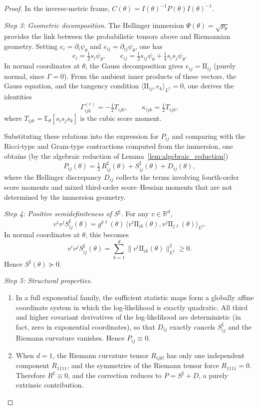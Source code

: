 \documentclass[11pt,letterpaper]{amsart}
\newcommand{\E}{\mathbb{E}}
\numberwithin{equation}{section}
\theoremstyle{plain}
\theoremstyle{definition}
\theoremstyle{remark}
\begin{document}
\begin{proof}
In the inverse-metric frame, $C(\theta)=I(\theta)^{-1}P(\theta)I(\theta)^{-1}$.

\medskip
\noindent\textit{Step 3: Geometric decomposition.}
The Hellinger immersion \(\Psi(\theta)=\sqrt{p_\theta}\) provides the link between the probabilistic tensors above and Riemannian geometry. Setting \(e_i=\partial_i\psi_\theta\) and \(e_{ij}=\partial_{ij}\psi_\theta\), one has
\[
e_i=\tfrac12 s_i\psi_\theta,
\qquad
e_{ij}=\tfrac12 s_{ij}\psi_\theta+\tfrac14 s_is_j\psi_\theta.
\]
In normal coordinates at \(\theta\), the Gauss decomposition gives \(e_{ij}=\mathrm{II}_{ij}\) (purely normal, since \(\Gamma=0\)). From the ambient inner products of these vectors, the Gauss equation, and the tangency condition \(\langle \mathrm{II}_{ij},e_k\rangle_{L^2}=0\), one derives the identities
\[
\Gamma^{(e)}_{ijk}=-\tfrac12 T_{ijk},
\qquad
\kappa_{ijk}=\tfrac12 T_{ijk},
\]
where \(T_{ijk}=\E_\theta[s_is_js_k]\) is the cubic score moment.

Substituting these relations into the expression for \(P_{ij}\) and comparing with the Ricci-type and Gram-type contractions computed from the immersion, one obtains (by the algebraic reduction of Lemma~\ref{lem:algebraic_reduction})
\[
P_{ij}(\theta)
=
\tfrac12\,R^\sharp_{ij}(\theta)+S^\sharp_{ij}(\theta)+D_{ij}(\theta),
\]
where the Hellinger discrepancy \(D_{ij}\) collects the terms involving fourth-order score moments and mixed third-order score--Hessian moments that are not determined by the immersion geometry.

\medskip
\noindent\textit{Step 4: Positive semidefiniteness of \(S^\sharp\).}
For any \(v\in\mathbb{R}^d\),
\[
v^iv^jS^\sharp_{ij}(\theta)
=
g^{k\ell}(\theta)\,\langle v^i\mathrm{II}_{ik}(\theta),v^j\mathrm{II}_{j\ell}(\theta)\rangle_{L^2}.
\]
In normal coordinates at \(\theta\), this becomes
\[
v^iv^jS^\sharp_{ij}(\theta)
=
\sum_{k=1}^d \big\|v^i\mathrm{II}_{ik}(\theta)\big\|_{L^2}^2\ge 0.
\]
Hence \(S^\sharp(\theta)\succeq 0\).

\medskip
\noindent\textit{Step 5: Structural properties.}
\begin{enumerate}
\item[(2)] In a full exponential family, the sufficient statistic maps form a globally affine coordinate system in which the log-likelihood is exactly quadratic. All third and higher covariant derivatives of the log-likelihood are deterministic (in fact, zero in exponential coordinates), so that \(D_{ij}\) exactly cancels \(S^\sharp_{ij}\) and the Riemann curvature vanishes. Hence \(P_{ij}\equiv 0\).
\item[(3)] When \(d=1\), the Riemann curvature tensor \(R_{ijkl}\) has only one independent component \(R_{1111}\), and the symmetries of the Riemann tensor force \(R_{1111}=0\). Therefore \(R^\sharp\equiv 0\), and the correction reduces to \(P=S^\sharp+D\), a purely extrinsic contribution. \qedhere
\end{enumerate}
\end{proof}
\end{document}
